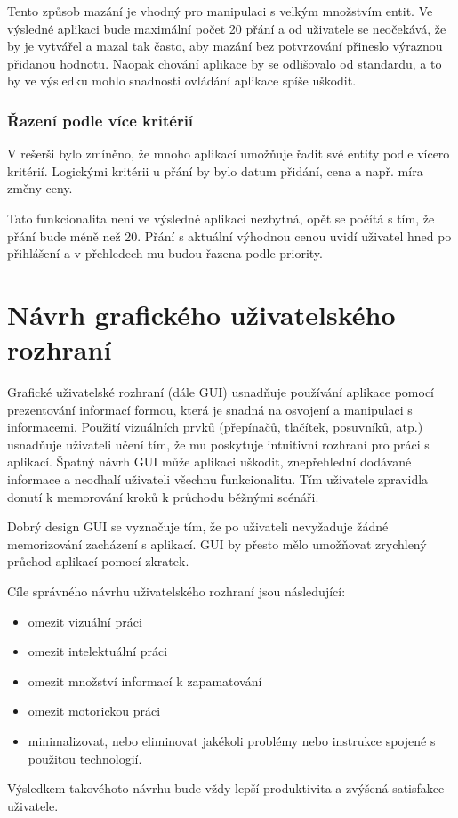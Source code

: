 Tento způsob mazání je vhodný pro manipulaci s velkým množstvím entit. Ve výsledné aplikaci bude maximální počet 20 přání a od uživatele se neočekává, že by je vytvářel a mazal tak často, aby mazání bez potvrzování přineslo výraznou přidanou hodnotu. Naopak chování aplikace by se odlišovalo od standardu, a to by ve výsledku mohlo snadnosti ovládání aplikace spíše uškodit.

\subsubsection{Řazení podle více kritérií}
V rešerši bylo zmíněno, že mnoho aplikací umožňuje řadit své entity podle vícero kritérií. Logickými kritérii u přání by bylo datum přidání, cena a např. míra změny ceny.

Tato funkcionalita není ve výsledné aplikaci nezbytná, opět se počítá s tím, že přání bude méně než 20. Přání s aktuální výhodnou cenou uvidí uživatel hned po přihlášení a v přehledech mu budou řazena podle priority.

\section{Návrh grafického uživatelského rozhraní}
\label{sec:navrh-gui}
Grafické uživatelské rozhraní (dále GUI) usnadňuje používání aplikace pomocí prezentování informací formou, která je snadná na osvojení a manipulaci s informacemi. Použití vizuálních prvků (přepínačů, tlačítek, posuvníků, atp.) usnadňuje uživateli učení tím, že mu poskytuje intuitivní rozhraní pro práci s aplikací. Špatný návrh GUI může aplikaci uškodit, znepřehlední dodávané informace a neodhalí uživateli všechnu funkcionalitu. Tím uživatele zpravidla donutí k memorování kroků k průchodu běžnými scénáři\cite{toby2001expgui}.

Dobrý design GUI se vyznačuje tím, že po uživateli nevyžaduje žádné memorizování zacházení s aplikací. GUI by přesto mělo umožňovat zrychlený průchod aplikací pomocí zkratek\cite{toby2001expgui}.

Cíle správného návrhu uživatelského rozhraní jsou následující\cite{galitz2007essential}:
\begin{itemize}
\item omezit vizuální práci
\item omezit intelektuální práci
\item omezit množství informací k zapamatování
\item omezit motorickou práci
\item minimalizovat, nebo eliminovat jakékoli problémy nebo instrukce spojené s použitou technologií.
\end{itemize}
Výsledkem takovéhoto návrhu bude vždy lepší produktivita a zvýšená satisfakce uživatele\cite{galitz2007essential}.

